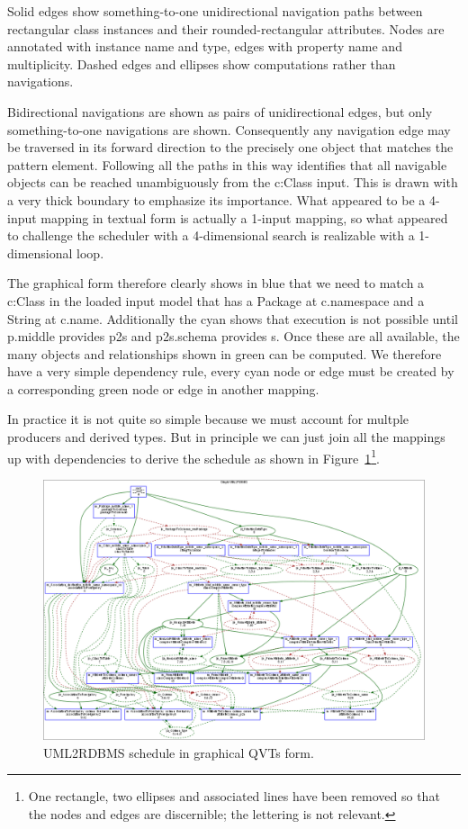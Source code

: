 \documentclass{llncs}
\begin{document}
Solid edges show something-to-one unidirectional navigation paths between rectangular class instances and their rounded-rectangular attributes. Nodes are annotated with instance name and type, edges with property name and multiplicity. Dashed edges and ellipses show computations rather than navigations.

Bidirectional navigations are shown as pairs of unidirectional edges, but only something-to-one navigations are shown. Consequently any navigation edge may be traversed in its forward direction to the precisely one object that matches the pattern element. Following all the paths in this way identifies that all navigable objects can be reached unambiguously from the c:Class input. This is drawn with a very thick boundary to emphasize its importance. What appeared to be a 4-input mapping in textual form is actually a 1-input mapping, so what appeared to challenge the scheduler with a 4-dimensional search is realizable with a 1-dimensional loop.

The graphical form therefore clearly shows in blue that we need to match a c:Class in the loaded input model that has a Package at c.namespace and a String at c.name. Additionally the cyan shows that execution is not possible until p.middle provides p2s and p2s.schema provides s. Once these are all available, the many objects and relationships shown in green can be computed. We therefore have a very simple dependency rule, every cyan node or edge must be created by a corresponding green node or edge in another mapping.

In practice it is not quite so simple because we must account for multple producers and derived types. But in principle we can just join all the mappings up with dependencies to derive the schedule as shown in Figure~\ref{fig:UML2RDBMS.qvts}\footnote{One rectangle, two ellipses and associated lines have been removed so that the nodes and edges are discernible; the lettering is not relevant.}.

\begin{figure}[h]
	\centering
	\includegraphics[width=1.0\textwidth]{UML2RDBMS-qvts.png}
	\caption{UML2RDBMS schedule in graphical QVTs form.}
	\label{fig:UML2RDBMS.qvts}
\end{figure}
\end{document}
